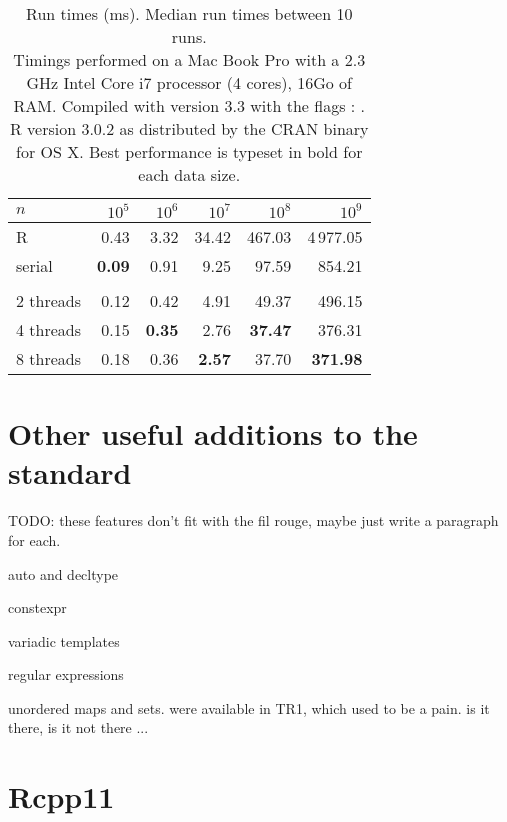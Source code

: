 \begin{table}
\centering
\begin{tabular}{lrrrrr}
\toprule
$n$ & $10^5$ & $10^6$ & $10^7$ & $10^8$ & $10^9$ \\
\midrule
R         & 0.43          & 3.32  & 34.42 & 467.03 & 4\,977.05 \\
serial    & \textbf{0.09} & 0.91  &  9.25 &  97.59 &    854.21 \\
\hspace{1.5cm} &
\hspace{1.5cm} &
\hspace{1.5cm} &
\hspace{1.5cm} &
\hspace{1.5cm} &
\hspace{1.5cm} \\
2 threads & 0.12          & 0.42          & 4.91          &  49.37          & 496.15          \\
4 threads & 0.15          & \textbf{0.35} & 2.76          &  \textbf{37.47} & 376.31          \\
8 threads & 0.18          & 0.36          & \textbf{2.57} &  37.70          & \textbf{371.98} \\
\bottomrule
\end{tabular}
\caption{\label{table:count}Run times (ms). Median run times between 10 runs.\\
{\footnotesize Timings performed on a Mac Book Pro with a 2.3 GHz Intel Core i7 processor (4 cores), 16Go of RAM.
Compiled with  version 3.3 with the flags : . R version 3.0.2
as distributed by the CRAN binary for OS X. Best performance is typeset in bold for each data size. }}
\end{table}

\section{Other useful additions to the standard}

TODO:
these features don't fit with the fil rouge, maybe just write a paragraph for each.

auto and decltype

constexpr

variadic templates

regular expressions

unordered maps and sets. were available in TR1, which used to be a pain. is it there, is it not there ...

\section{Rcpp11}

